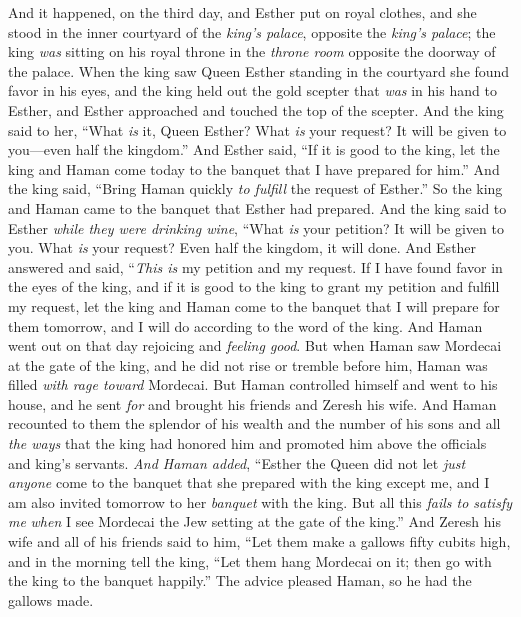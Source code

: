 \begin{biblechapter} %
 And it happened, on the third day, and Esther put on royal clothes, and she stood in the inner courtyard of the \textit{king’s palace}, opposite the \textit{king’s palace}; the king \textit{was} sitting on his royal throne in the \textit{throne room} opposite the doorway of the palace.
\verse When the king saw Queen Esther standing in the courtyard she found favor in his eyes, and the king held out the gold scepter that \textit{was} in his hand to Esther, and Esther approached and touched the top of the scepter.
\verse And the king said to her, “What \textit{is} it, Queen Esther? What \textit{is} your request? It will be given to you—even half the kingdom.”
\verse And Esther said, “If it is good to the king, let the king and Haman come today to the banquet that I have prepared for him.”
\verse And the king said, “Bring Haman quickly \textit{to fulfill} the request of Esther.” So the king and Haman came to the banquet that Esther had prepared.
\verse And the king said to Esther \textit{while they were drinking wine}, “What \textit{is} your petition? It will be given to you. What \textit{is} your request? Even half the kingdom, it will done.
\verse And Esther answered and said, “\textit{This is} my petition and my request.
\verse If I have found favor in the eyes of the king, and if it is good to the king to grant my petition and fulfill my request, let the king and Haman come to the banquet that I will prepare for them tomorrow, and I will do according to the word of the king.
\verse And Haman went out on that day rejoicing and \textit{feeling good}. But when Haman saw Mordecai at the gate of the king, and he did not rise or tremble before him, Haman was filled \textit{with rage toward} Mordecai.
\verse But Haman controlled himself and went to his house, and he sent \textit{for} and brought his friends and Zeresh his wife.
\verse And Haman recounted to them the splendor of his wealth and the number of his sons and all \textit{the ways} that the king had honored him and promoted him above the officials and king’s servants.
\verse \textit{And Haman added}, “Esther the Queen did not let \textit{just anyone} come to the banquet that she prepared with the king except me, and I am also invited tomorrow to her \textit{banquet} with the king.
\verse But all this \textit{fails to satisfy me} \textit{when} I see Mordecai the Jew setting at the gate of the king.”
\verse And Zeresh his wife and all of his friends said to him, “Let them make a gallows fifty cubits high, and in the morning tell the king, “Let them hang Mordecai on it; then go with the king to the banquet happily.” The advice pleased Haman, so he had the gallows made.
\end{biblechapter}

